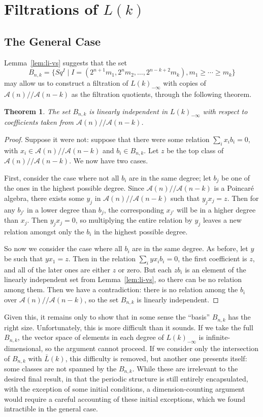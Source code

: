 \documentclass{article}
\newcommand{\A}{\mathcal{A}}
\newcommand{\mmod}{/\!/\!}
\renewcommand{\L}{\bar{L}}
\newcommand{\Lkm}[1][k]{L{(#1)}_{-\infty}}
\newtheorem{thm}{Theorem}
\begin{document}
\section{Filtrations of \boldmath$L(k)$}

\subsection{The General Case}

Lemma~\ref{lem:li-vs} suggests that the set
\[ B_{n,k} = \{Sq^I \mid I = (2^{n+1}m_1, 2^n m_2, \ldots, 2^{n-k+2}m_k), m_1 \geq \cdots \geq m_k \} \]
may allow us to construct a filtration of $\Lkm$ with copies of $\A(n)\mmod\A(n-k)$ as the filtration quotients, through the following theorem.

\begin{thm}\label{thm:li-module}
  The set $B_{n,k}$ is linearly independent in $\Lkm$ with respect to coefficients taken from $\A(n)\mmod\A(n-k)$.
\end{thm}

\begin{proof}
  Suppose it were not: suppose that there were some relation $\sum_i x_i b_i = 0$, with $x_i\in\A(n)\mmod\A(n-k)$ and $b_i\in B_{n,k}$.  Let $z$ be the top class of $\A(n)\mmod\A(n-k)$.  We now have two cases.

  First, consider the case where not all $b_i$ are in the same degree; let $b_j$ be one of the ones in the highest possible degree.  Since $\A(n)\mmod\A(n-k)$ is a Poincar\'e algebra, there exists some $y_j$ in $\A(n)\mmod\A(n-k)$ such that $y_j x_j = z$.  Then for any $b_{j'}$ in a lower degree than $b_j$, the corresponding $x_{j'}$ will be in a higher degree than $x_j$.  Then $y_j x_j = 0$, so multiplying the entire relation by $y_j$ leaves a new relation amongst only the $b_i$ in the highest possible degree.

  So now we consider the case where all $b_i$ are in the same degree.  As before, let $y$ be such that $y x_1 = z$.  Then in the relation $\sum_i y x_i b_i = 0$, the first coefficient is $z$, and all of the later ones are either $z$ or zero.  But each $z b_i$ is an element of the linearly independent set from Lemma~\ref{lem:li-vs}, so there can be no relation among them.  Then we have a contradiction: there is no relation among the $b_i$ over $\A(n)\mmod\A(n-k)$, so the set $B_{n,k}$ is linearly independent.
\end{proof}

Given this, it remains only to show that in some sense the ``basis'' $B_{n,k}$ has the right size.  Unfortunately, this is more difficult than it sounds.  If we take the full $B_{n,k}$, the vector space of elements in each degree of $\Lkm$ is infinite-dimensional, so the argument cannot proceed.  If we consider only the intersection of $B_{n,k}$ with $\L(k)$, this difficulty is removed, but another one presents itself: some classes are not spanned by the $B_{n,k}$.  While these are irrelevant to the desired final result, in that the periodic structure is still entirely encapsulated, with the exception of some initial conditions, a dimension-counting argument would require a careful accounting of these initial exceptions, which we found intractible in the general case.
\end{document}
